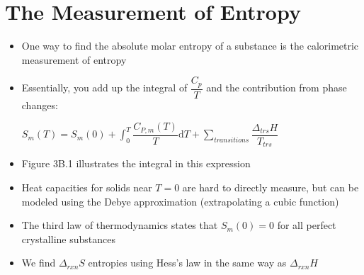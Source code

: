 \documentclass[12pt, openany, letterpaper]{memoir}
\begin{document}
\section{The Measurement of Entropy}
\begin{itemize}
	\item One way to find the absolute molar entropy of a substance is the calorimetric measurement of entropy
	\item Essentially, you add up the integral of $\dfrac{C_p}{T}$ and the contribution from phase changes:

	      $S_m(T) = S_m(0) + \displaystyle\int_0^T\dfrac{C_{P,m}(T)}{T}\mathrm{d}T + \displaystyle\sum\limits_{transitions}\dfrac{\Delta_{trs}H}{T_{trs}}$
	\item Figure 3B.1 illustrates the integral in this expression
	\item Heat capacities for solids near $T=0$ are hard to directly measure, but can be modeled using the Debye approximation (extrapolating a cubic function)
	\item The third law of thermodynamics states that $S_m(0) = 0$ for all perfect crystalline substances
	\item We find $\Delta_{rxn}S$ entropies using Hess's law in the same way as $\Delta_{rxn} H$
\end{itemize}
\end{document}
